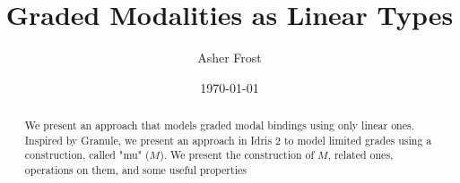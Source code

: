 \documentclass[authordraft=true,review=true,nonacm=true,natbib=false,acmsmall]{acmart}
\begin{document}
\title{Graded Modalities as Linear Types}
\author{Asher Frost}
\date{\today}
	
\begin{abstract}
	We present an approach that models graded modal bindings using only linear ones.
	Inspired by Granule, we present an approach in Idris 2 to model limited grades using a construction, called "mu" ($M$).
	We present the construction of $M$, related ones, operations on them, and some useful properties
\end{abstract}	
\maketitle	
\listoftodos


\printbibliography
\end{document}

